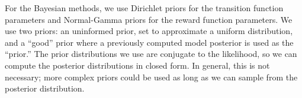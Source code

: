 

For the Bayesian methods, we use Dirichlet priors for
the transition function parameters and Normal-Gamma priors for the
reward function parameters. We use two priors: an uninformed prior,
set to approximate a uniform distribution, and a ``good'' prior where
a previously computed model posterior is used as the ``prior.''
 The prior
distributions we use are conjugate to the likelihood, so we can compute the
posterior distributions in closed form.
In general, this is not necessary; more complex priors could be used
as long as we can sample from the posterior distribution.



